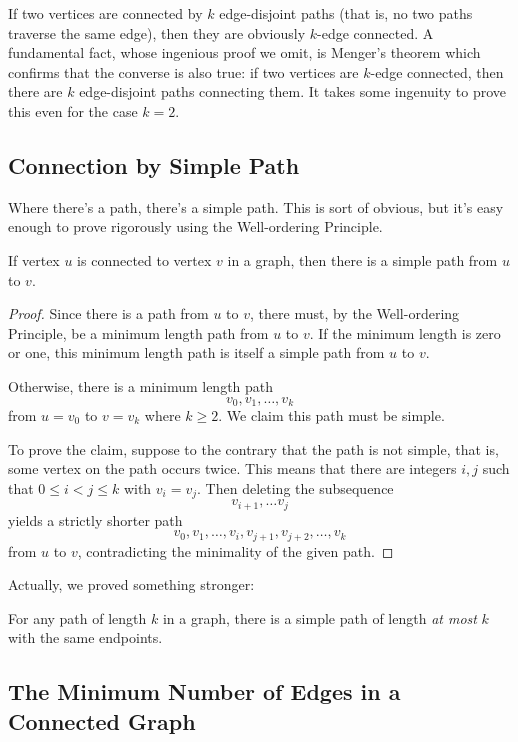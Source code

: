 If two vertices are connected by $k$ edge-disjoint paths (that is, no two
paths traverse the same edge), then they are obviously $k$-edge connected.
A fundamental fact, whose ingenious proof we omit, is Menger's theorem
which confirms that the converse is also true: if two vertices are
$k$-edge connected, then there are $k$ edge-disjoint paths connecting
them.  It takes some ingenuity to prove this even for the case $k=2$.




\subsection{Connection by Simple Path}

Where there's a path, there's a simple path.  This is sort of obvious, but
it's easy enough to prove rigorously using the Well-ordering Principle.

\begin{lemma}\label{simplepath}
If vertex $u$ is connected to vertex $v$ in a graph, then there is a
simple path from $u$ to $v$.
\end{lemma}

\begin{proof}
Since there is a path from $u$ to $v$, there must, by the Well-ordering
Principle, be a minimum length path from $u$ to $v$.  If the minimum
length is zero or one, this minimum length path is itself a simple path
from $u$ to $v$.

Otherwise, there is a minimum length path
\[
v_0, v_1,\dots, v_k
\]
from $u = v_0$ to $v = v_k$ where $k \geq 2$.  We claim this path must be
simple.

To prove the claim, suppose to the contrary that the path is not simple,
that is, some vertex on the path occurs twice.  This means that there are
integers $i,j$ such that $0 \leq i < j \leq k$ with $v_i= v_j$.  Then
deleting the subsequence
\[
v_{i+1}, \dots v_j
\]
yields a strictly shorter path
\[
v_0, v_1,\dots, v_i,v_{j+1},v_{j+2},\dots, v_k
\]
from $u$ to $v$, contradicting the minimality of the given path.
\end{proof}

Actually, we proved something stronger:
\begin{corollary}\label{ss}
For any path of length $k$ in a graph, there is a simple path of length
\emph{at most} $k$ with the same endpoints.
\end{corollary}

\subsection{The Minimum Number of Edges in a Connected Graph}

